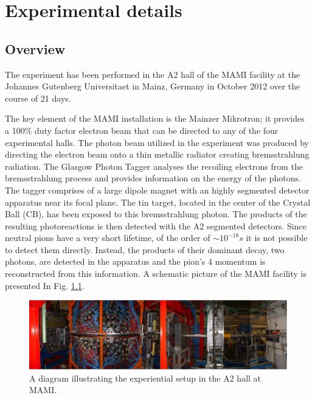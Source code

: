 \setcounter{equation}{0}

\chapter{Experimental details}

\section{Overview}

\indent The experiment has been performed in the A2 hall of the MAMI facility at the Johannes Gutenberg Universitaet in Mainz, Germany in October 2012 over the course of 21 days.

\indent The key element of the MAMI installation is the Mainzer Mikrotron; it provides a 100\% duty factor electron beam that can be directed to any of the four experimental halls. The photon beam utilized in the experiment was produced by directing the electron beam onto a thin metallic radiator creating bremsstrahlung radiation. The Glasgow Photon Tagger analyses the recoiling electrons from the bremsstrahlung process and provides information on the energy of the photons. The tagger comprises of a large dipole magnet with an highly segmented detector apparatus near its focal plane. The tin target, located in the center of the Crystal Ball (CB), has been exposed to this bremsstrahlung photon. The products of the resulting photoreactions is then detected with the A2 segmented detectors. Since neutral pions have a very short lifetime, of the order of $\sim10^{-18}s$ it is not possible to detect them directly. Instead, the products of their dominant decay, two photons, are detected in the apparatus and the pion's 4 momentum is reconstructed from this information. A schematic picture of the MAMI facility is presented In Fig. \ref{a2hallsetup}.

\begin{figure}[H]
\begin{center}
\includegraphics[scale=0.55]{pictures/png/a2hallsetup.png}
\caption{A diagram illustrating the experiential setup in the A2 hall at MAMI.}
\label{a2hallsetup}
\end{center}
\end{figure}

